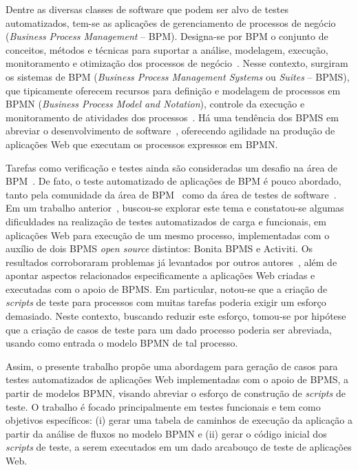 \documentclass[12pt]{article}
\begin{document}
Dentre as diversas classes de software que podem ser alvo de testes automatizados, tem-se as aplicações de gerenciamento de processos de negócio (\emph{Business Process Management} -- BPM). Designa-se por BPM o conjunto de conceitos, métodos e técnicas para suportar a análise, modelagem, execução, monitoramento e otimização dos processos de negócio~\cite{weske}. Nesse contexto, surgiram os sistemas de BPM (\emph{Business Process Management Systems} ou \emph{Suites} -- BPMS), que tipicamente oferecem  recursos para definição e modelagem de processos em BPMN (\emph{Business Process Model and Notation}), controle da execução e monitoramento de atividades dos processos~\cite{forrester}. Há uma tendência dos BPMS em abreviar o desenvolvimento de software~\cite{greenresearch}, oferecendo agilidade na produção de aplicações Web que executam os processos expressos em BPMN. 

Tarefas como verificação e testes ainda são consideradas um desafio na área de BPM~\cite{aalst2013survey}. De fato, o teste automatizado de aplicações de BPM é pouco abordado, tanto pela comunidade da área de BPM~\cite{weske} como da área de testes de software~\cite{graham2012experiences}. Em um trabalho anterior~\cite{sbqs2015}, buscou-se explorar este tema e constatou-se algumas dificuldades na realização de testes automatizados de carga e funcionais, em aplicações Web para execução de um mesmo processo, implementadas com o auxílio de dois BPMS \emph{open source} distintos: Bonita BPMS e Activiti. Os resultados corroboraram problemas já levantados por outros autores~\cite{Rafi:2012, Wiklund:2014}, além de apontar aspectos relacionados especificamente a aplicações Web criadas e executadas com o apoio de BPMS. Em particular, notou-se que a criação de \emph{scripts} de teste para processos com muitas tarefas poderia exigir um esforço demasiado. Neste contexto, buscando reduzir este esforço, tomou-se por hipótese que a criação de casos de teste para um dado processo poderia ser abreviada, usando como entrada o modelo BPMN de tal processo. 

Assim, o presente trabalho propõe uma abordagem para geração de casos para testes automatizados de aplicações Web implementadas com o apoio de BPMS, a partir de modelos BPMN, visando abreviar o esforço de construção de \emph{scripts} de teste. O trabalho é focado principalmente em testes funcionais e tem como objetivos específicos: (i) gerar uma tabela de caminhos de execução da aplicação a partir da análise de fluxos no modelo BPMN e (ii) gerar o código inicial dos \emph{scripts} de teste, a serem executados em um dado arcabouço de teste de aplicações Web.
\end{document}
